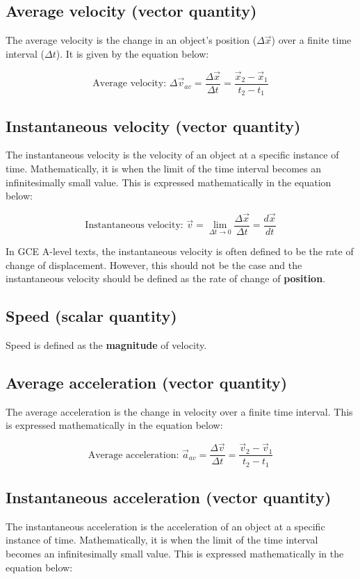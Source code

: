 \documentclass[11pt]{article}
\begin{document}
\subsection{Average velocity (vector quantity)}
\label{sec:org7d8e571}
The average velocity is the change in an object's position (\(\Delta \vec{x}\)) over a finite time interval (\(\Delta t\)). It is given by the equation below:

\[\text{Average velocity: } \Delta \vec{v}_{av} = \frac{\Delta \vec{x}}{\Delta t} = \frac{\vec{x}_2 - \vec{x}_1}{t_2 - t_1}\]

\subsection{Instantaneous velocity (vector quantity)}
\label{sec:org838aca4}
The instantaneous velocity is the velocity of an object at a specific instance of time. Mathematically, it is when the limit of the time interval becomes an infinitesimally small value. This is expressed mathematically in the equation below:

\[\text{Instantaneous velocity: } \vec{v} = \lim_{\Delta t \rightarrow 0} \frac{\Delta \vec{x}}{\Delta t} = \frac{d \vec{x}}{dt}\]

In GCE A-level texts, the instantaneous velocity is often defined to be the rate of change of displacement. However, this should not be the case and the instantaneous velocity should be defined as the rate of change of \textbf{position}.

\subsection{Speed (scalar quantity)}
\label{sec:org70b726c}
Speed is defined as the \textbf{magnitude} of velocity.

\subsection{Average acceleration (vector quantity)}
\label{sec:org77ea53b}
The average acceleration is the change in velocity over a finite time interval. This is expressed mathematically in the equation below:

\[\text{Average acceleration: } \vec{a}_{av} = \frac{\Delta \vec{v}}{\Delta t} = \frac{\vec{v}_2 - \vec{v}_1}{t_2 - t_1}\]

\subsection{Instantaneous acceleration (vector quantity)}
\label{sec:org5b1daea}
The instantaneous acceleration is the acceleration of an object at a specific instance of time. Mathematically, it is when the limit of the time interval becomes an infinitesimally small value. This is expressed mathematically in the equation below:
\end{document}
